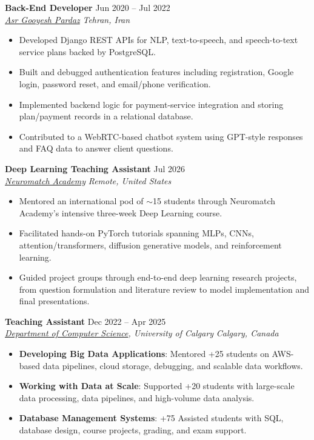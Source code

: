 \documentclass[a4paper,10pt]{article}
\newcommand{\resumeSubheading}[4]{
    \textbf{#1} \hfill #2 \\
    \textit{#3} \hfill \textit{#4}
}
\begin{document}
\resumeSubheading
{Back-End Developer}
{Jun 2020 -- Jul 2022}
{\href{https://asr-gooyesh.com/en/}{Asr Gooyesh Pardaz}}
{Tehran, Iran}
\begin{itemize}[leftmargin=0.25in]
    \item Developed Django REST APIs for NLP, text-to-speech, and speech-to-text service plans backed by PostgreSQL.
    \item Built and debugged authentication features including registration, Google login, password reset, and email/phone verification.
    \item Implemented backend logic for payment-service integration and storing plan/payment records in a relational database.
    \item Contributed to a WebRTC-based chatbot system using GPT-style responses and FAQ data to answer client questions.
\end{itemize}

\resumeSubheading
{Deep Learning Teaching Assistant}
{Jul 2026}
{\href{https://neuromatch.io/}{Neuromatch Academy}}
{Remote, United States}
\begin{itemize}[leftmargin=0.25in]
    \item Mentored an international pod of $\sim$15 students through Neuromatch Academy's intensive three-week Deep Learning course.
    \item Facilitated hands-on PyTorch tutorials spanning MLPs, CNNs, attention/transformers, diffusion generative models, and reinforcement learning.
    \item Guided project groups through end-to-end deep learning research projects, from question formulation and literature review to model implementation and final presentations.
\end{itemize}

\resumeSubheading
{Teaching Assistant}
{Dec 2022 -- Apr 2025}
{\href{https://science.ucalgary.ca/computer-science} {Department of Computer Science}, University of Calgary}
{Calgary, Canada}
\begin{itemize}[leftmargin=0.25in]
    \item \textbf{Developing Big Data Applications}: Mentored +25 students on AWS-based data pipelines, cloud storage, debugging, and scalable data workflows. 
    \item \textbf{Working with Data at Scale}: Supported +20 students with large-scale data processing, data pipelines, and high-volume data analysis. 
    \item \textbf{Database Management Systems}: +75 Assisted students with SQL, database design, course projects, grading, and exam support.
\end{itemize}
\end{document}
